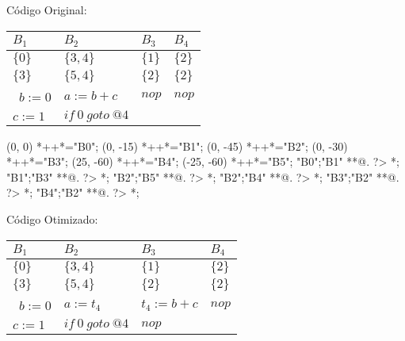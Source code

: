 C\'odigo Original:

\begin{table}[ht]
\begin{scriptsize}
\begin{tabular}{l|l|l|l}
$B_{1}$ & $B_{2}$ & $B_{3}$ & $B_{4}$ \\
\hline
$\{0\}$ & $\{3, 4\}$ & $\{1\}$ & $\{2\}$ \\
$\{3\}$ & $\{5, 4\}$ & $\{2\}$ & $\{2\}$ \\
\hline\
$b:=0$ & $a:=b+c$ & $nop$ & $nop$ \\
$c:=1$ & $if\:0\:goto\:@4$ &  &  \\
\end{tabular}
\end{scriptsize}
\end{table}

\begin{scriptsize}
\xy(0, 0)
	*++{}*\frm{-,}="B0";
(0, -15)
	*++{}*\frm{-,}="B1";
(0, -45)
	*++{}*\frm{-,}="B2";
(0, -30)
	*++{}*\frm{-,}="B3";
(25, -60)
	*++{}*\frm{-,}="B4";
(-25, -60)
	*++{}*\frm{-,}="B5";
"B0";"B1" **@{.} ?> *{\dir{>}};
"B1";"B3" **@{.} ?> *{\dir{>}};
"B2";"B5" **@{.} ?> *{\dir{>}};
"B2";"B4" **@{.} ?> *{\dir{>}};
"B3";"B2" **@{.} ?> *{\dir{>}};
"B4";"B2" **@{.} ?> *{\dir{>}};
\endxy
\end{scriptsize}


C\'odigo Otimizado:

\begin{table}[ht]
\begin{scriptsize}
\begin{tabular}{l|l|l|l}
$B_{1}$ & $B_{2}$ & $B_{3}$ & $B_{4}$ \\
\hline
$\{0\}$ & $\{3, 4\}$ & $\{1\}$ & $\{2\}$ \\
$\{3\}$ & $\{5, 4\}$ & $\{2\}$ & $\{2\}$ \\
\hline\
$b:=0$ & $a:=t_{4}$ & $t_{4}:=b+c$ & $nop$ \\
$c:=1$ & $if\:0\:goto\:@4$ & $nop$ &  \\
\end{tabular}
\end{scriptsize}
\end{table}

